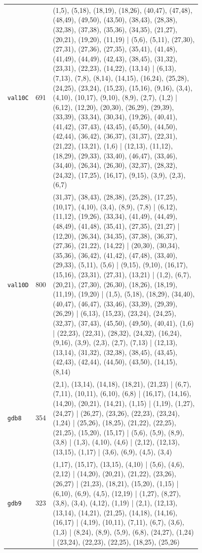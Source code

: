 \begin{landscape}
\begin{longtable}{lr>{\tiny\raggedright\arraybackslash}p{0.78\linewidth}}
\texttt{val10C} & 691 & (1,5), (5,18), (18,19), (18,26), (40,47), (47,48), (48,49), (49,50), (43,50), (38,43), (28,38), (32,38), (37,38), (35,36), (34,35), (21,27), (20,21), (19,20), (11,19) | (5,6), (5,11), (27,30), (27,31), (27,36), (27,35), (35,41), (41,48), (41,49), (44,49), (42,43), (38,45), (31,32), (23,31), (22,23), (14,22), (13,14) | (6,13), (7,13), (7,8), (8,14), (14,15), (16,24), (25,28), (24,25), (23,24), (15,23), (15,16), (9,16), (3,4), (4,10), (10,17), (9,10), (8,9), (2,7), (1,2) | (6,12), (12,20), (20,30), (26,29), (29,39), (33,39), (33,34), (30,34), (19,26), (40,41), (41,42), (37,43), (43,45), (45,50), (44,50), (42,44), (36,42), (36,37), (31,37), (22,31), (21,22), (13,21), (1,6) | (12,13), (11,12), (18,29), (29,33), (33,40), (46,47), (33,46), (34,40), (26,34), (26,30), (32,37), (28,32), (24,32), (17,25), (16,17), (9,15), (3,9), (2,3), (6,7) \\[2pt]
\texttt{val10D} & 800 & (31,37), (38,43), (28,38), (25,28), (17,25), (10,17), (4,10), (3,4), (8,9), (7,8) | (6,12), (11,12), (19,26), (33,34), (41,49), (44,49), (48,49), (41,48), (35,41), (27,35), (21,27) | (12,20), (26,34), (34,35), (37,38), (36,37), (27,36), (21,22), (14,22) | (20,30), (30,34), (35,36), (36,42), (41,42), (47,48), (33,40), (29,33), (5,11), (5,6) | (9,15), (9,10), (16,17), (15,16), (23,31), (27,31), (13,21) | (1,2), (6,7), (20,21), (27,30), (26,30), (18,26), (18,19), (11,19), (19,20) | (1,5), (5,18), (18,29), (34,40), (40,47), (46,47), (33,46), (33,39), (29,39), (26,29) | (6,13), (15,23), (23,24), (24,25), (32,37), (37,43), (45,50), (49,50), (40,41), (1,6) | (22,23), (22,31), (28,32), (24,32), (16,24), (9,16), (3,9), (2,3), (2,7), (7,13) | (12,13), (13,14), (31,32), (32,38), (38,45), (43,45), (42,43), (42,44), (44,50), (43,50), (14,15), (8,14) \\[2pt]
\texttt{gdb8} & 354 & (2,1), (13,14), (14,18), (18,21), (21,23) | (6,7), (7,11), (10,11), (6,10), (6,8) | (16,17), (14,16), (14,20), (20,21), (14,21), (1,15) | (1,19), (1,27), (24,27) | (26,27), (23,26), (22,23), (23,24), (1,24) | (25,26), (18,25), (21,22), (22,25), (21,25), (15,20), (15,17) | (5,6), (5,9), (8,9), (3,8) | (1,3), (4,10), (4,6) | (2,12), (12,13), (13,15), (1,17) | (3,6), (6,9), (4,5), (3,4) \\[2pt]
\texttt{gdb9} & 323 & (1,17), (15,17), (13,15), (4,10) | (5,6), (4,6), (2,12) | (14,20), (20,21), (21,22), (23,26), (26,27) | (21,23), (18,21), (15,20), (1,15) | (6,10), (6,9), (4,5), (12,19) | (1,27), (8,27), (3,8), (3,4), (4,12), (1,19) | (2,1), (12,13), (13,14), (14,21), (21,25), (14,18), (14,16), (16,17) | (4,19), (10,11), (7,11), (6,7), (3,6), (1,3) | (8,24), (8,9), (5,9), (6,8), (24,27), (1,24) | (23,24), (22,23), (22,25), (18,25), (25,26) \\[2pt]

\end{longtable}
\end{landscape}
